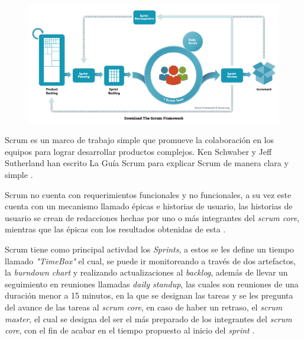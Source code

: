 \documentclass[10pt]{article}
\begin{document}
\begin{figure}[H]
	\begin{center}
\includegraphics[scale = 0.80]{Imagenes/ScrumFramework.png}
	\end{center} 
\end{figure}

Scrum es un marco de trabajo simple que promueve la colaboración en los equipos para lograr desarrollar productos complejos. Ken Schwaber y Jeff Sutherland han escrito La Guía Scrum para explicar Scrum de manera clara y simple \cite{IEEEreferencias:Ref21}. \newline

\setlength{\parskip}{2mm}

Scrum no cuenta con requerimientos funcionales y no funcionales, a su vez este cuenta con un mecanismo llamado épicas e historias de usuario, las historias de usuario se crean de redacciones hechas por uno o más integrantes del \textit{scrum core}, mientras que las épicas con los resultados obtenidas de esta \cite{IEEEreferencias:Ref21}.\newline

\setlength{\parskip}{2mm}

Scrum tiene como principal activdad los \textit{Sprints}, a estos se les define un tiempo llamado \textit{"TimeBox"} el cual, se puede ir monitoreando a través de dos artefactos, la \textit{burndown chart} y realizando actualizaciones al \textit{backlog}, además de llevar un seguimiento en reuniones llamadas \textit{daily standup}, las cuales son reuniones de una duración menor a 15 minutos, en la que se designan las tareas y se les pregunta del avance de las tareas al \textit{scrum core}, en caso de haber un retraso, el \textit{scrum master}, el cual se designa del ser el más preparado de los integrantes del \textit{scrum core}, con el fin de acabar en el tiempo propuesto al inicio del \textit{sprint} \cite{IEEEreferencias:Ref21}.\newline
\end{document}
